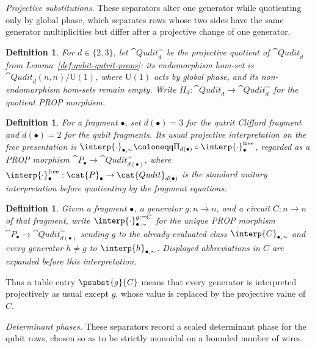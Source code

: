 \documentclass[10pt,a4paper]{article}
\newtheorem{definition}[theorem]{Definition}
\def\cref#1{Lemma~\ref{#1}}%
\begin{document}
\emph{Projective substitutions.}
These separators alter one generator while quotienting only by global phase, which separates rows
whose two sides have the same generator multiplicities but differ after a projective change of one
generator.

\begin{definition}\label{def:projective-quotient}
For \(d\in\{2,3\}\), let \(\cat{Qudit}_d^{\sim}\) be the projective quotient of
\(\cat{Qudit}_d\) from \cref{def:qubit-qutrit-props}: its endomorphism hom-set
is \(\cat{Qudit}_d(n,n)/\mathrm{U}(1)\), where \(\mathrm{U}(1)\) acts by global
phase, and its non-endomorphism hom-sets remain empty.  Write
\(\Pi_d:\cat{Qudit}_d\to\cat{Qudit}_d^{\sim}\) for the quotient PROP morphism.
\end{definition}

\begin{definition}\label{def:projective-interpretation}
For a fragment \(\bullet\), set \(d(\bullet)=3\) for the qutrit Clifford
fragment and \(d(\bullet)=2\) for the qubit fragments.  Its usual projective
interpretation on the free presentation is
\(\interp{\cdot}_{\bullet,\sim}\coloneqq
\Pi_{d(\bullet)}\circ\interp{\cdot}^{\mathrm{free}}_\bullet\), regarded as a
PROP morphism \(\cat{P}_\bullet\to\cat{Qudit}_{d(\bullet)}^{\sim}\), where
\(\interp{\cdot}^{\mathrm{free}}_\bullet:\cat{P}_\bullet\to
\cat{Qudit}_{d(\bullet)}\) is the standard unitary interpretation before
quotienting by the fragment equations.
\end{definition}

\begin{definition}\label{def:projective-subst}
Given a fragment \(\bullet\), a generator \(g:n\to n\), and a circuit \(C:n\to n\) of that fragment, write
\(\interp{\cdot}_{\bullet,\sim}^{g:=C}\) for the unique PROP morphism
\(\cat{P}_\bullet\to\cat{Qudit}_{d(\bullet)}^{\sim}\) sending \(g\) to the already-evaluated
class \(\interp{C}_{\bullet,\sim}\) and every generator \(h\neq g\) to
\(\interp{h}_{\bullet,\sim}\).  Displayed abbreviations in \(C\) are expanded before this
interpretation.
\end{definition}

Thus a table entry \(\psubst{g}{C}\) means that every generator is interpreted projectively as
usual except \(g\), whose value is replaced by the projective value of \(C\).

\emph{Determinant phases.}
These separators record a scaled determinant phase for the qubit rows, chosen so as to be strictly
monoidal on a bounded number of wires.
\end{document}

